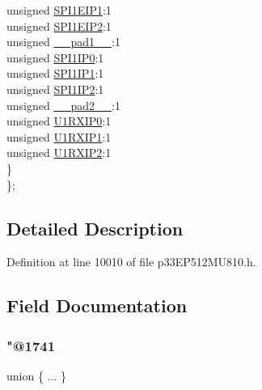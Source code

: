 \begin{DoxyCompactItemize}
\begin{tabbing}
\>\>unsigned \hyperlink{structtag_i_p_c2_b_i_t_s_a81929b274f99c15cff29b160775bfcf4}{SPI1EIP1}:1\\
\>\>unsigned \hyperlink{structtag_i_p_c2_b_i_t_s_aafd5cc7151b58bdc7545b80d2158f57b}{SPI1EIP2}:1\\
\>\>unsigned \hyperlink{structtag_i_p_c2_b_i_t_s_acaf2d0924a107ec6e8d2e31febaf66f9}{\_\_pad1\_\_}:1\\
\>\>unsigned \hyperlink{structtag_i_p_c2_b_i_t_s_a4e0930216ff0060978badbc15734244e}{SPI1IP0}:1\\
\>\>unsigned \hyperlink{structtag_i_p_c2_b_i_t_s_ae7dbc0c5682305b74a43fe06fb0215b2}{SPI1IP1}:1\\
\>\>unsigned \hyperlink{structtag_i_p_c2_b_i_t_s_a3bff44e7b49ee092e9b718a30e7f0598}{SPI1IP2}:1\\
\>\>unsigned \hyperlink{structtag_i_p_c2_b_i_t_s_a4d97cc5f7d51d22fc2bf3eab35c9cb7f}{\_\_pad2\_\_}:1\\
\>\>unsigned \hyperlink{structtag_i_p_c2_b_i_t_s_a1c4e10325a796754cba6c834855988a7}{U1RXIP0}:1\\
\>\>unsigned \hyperlink{structtag_i_p_c2_b_i_t_s_a725f530d494fe5181b62082b654a8681}{U1RXIP1}:1\\
\>\>unsigned \hyperlink{structtag_i_p_c2_b_i_t_s_a13b6fb969d7a0d3e87367d7d28339e18}{U1RXIP2}:1\\
\>\} \\
\}; \\

\end{tabbing}\end{DoxyCompactItemize}


\subsection{Detailed Description}


Definition at line 10010 of file p33\+E\+P512\+M\+U810.\+h.



\subsection{Field Documentation}
\mbox{\label{structtag_i_p_c2_b_i_t_s_a37a001e4eedde3196a55f961971b69f8}} 
\subsubsection{\texorpdfstring{"@1741}{@1741}}
{\footnotesize\ttfamily union \{ ... \} }

